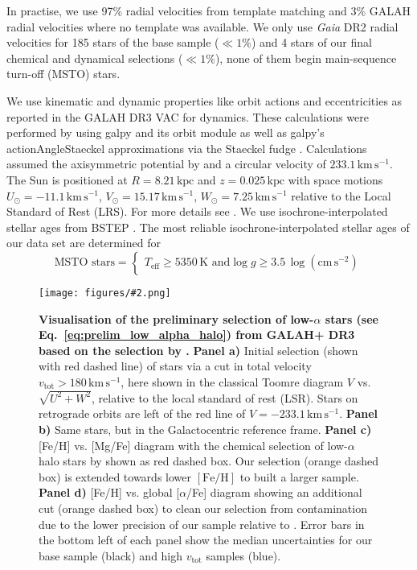 \documentclass[fleqn,usenatbib]{mnras}
\newcommand{\added}[1]{#1}
\newcommand{\kpc}{\,\mathrm{kpc}}	%
\newcommand{\kms}{\,\mathrm{km\,s^{-1}}}	%
\newcommand{\Gaia}{\textit{Gaia}\xspace} %
\newcommand{\codeicon}{{\faCloudDownload}}
\newcommand{\codelink}[1]{\href{https://github.com/svenbuder/Accreted-stars-in-GALAH-DR3/tree/main/figures/#1.ipynb}{\codeicon}\,\,}
\newcommand{\oscaption}[2]{\caption{#2 \codelink{#1}}}
\newcommand{\figuretextwidth}[4]{\begin{figure*} \centering \texttt{[image: figures/\#2.png]}\oscaption{#3}{#4}\label{fig:#2} \end{figure*}}
\begin{document}
\added{In practise, we use 97\% radial velocities from template matching and 3\% GALAH radial velocities where no template was available. We only use \Gaia DR2 radial velocities for 185 stars of the base sample ($\ll 1\%$) and 4 stars of our final chemical and dynamical selections ($\ll1\%$), none of them begin main-sequence turn-off (MSTO) stars.}

We use kinematic and dynamic properties like orbit actions and eccentricities as reported in the GALAH DR3 VAC for dynamics. These calculations were performed by using {\sc galpy} \citep{Bovy2015} and its {\sc orbit} module as well as {\sc galpy}'s {\sc actionAngleStaeckel} approximations via the Staeckel fudge  \citep{Binney2012, Mackereth2018}. Calculations assumed the axisymmetric potential by \citet{McMillan2017} and a circular velocity of $233.1\kms$. The Sun is positioned at $R = 8.21\kpc$ and $z=0.025\kpc$ \citep{Juric2008} with space motions $U_\odot = -11.1\kms$, $V_\odot = 15.17\kms$, $W_\odot = 7.25\kms$ \citep{Schoenrich2010,Reid2004} relative to the Local Standard of Rest (LRS).  For more details see \citet{Buder2021}. We use isochrone-interpolated stellar ages from BSTEP \citep{Sharma2018}. The most reliable isochrone-interpolated stellar ages of our data set are determined for
\begin{equation} \label{eq:msto}
\text{MSTO stars} = 
\begin{cases}
T_\text{eff} \geq 5350\,\mathrm{K} \text{ and} 
\log g \geq 3.5\,\mathrm{\log \left(cm\,s^{-2} \right)} 
\end{cases}
\end{equation}

\figuretextwidth{17cm}{nissen_selection_corner}{chemical_differences}{
\textbf{Visualisation of the preliminary selection of low-$\alpha$ stars (see Eq.~\ref{eq:prelim_low_alpha_halo}) from GALAH+ DR3 based on the selection by \citet{Nissen2010}.}
\textbf{Panel a)} Initial selection (shown with red dashed line) of stars via a cut in total velocity $v_\text{tot} > 180\,\mathrm{km\,s^{-1}}$, here shown in the classical Toomre diagram $V$ vs. $\sqrt{U^2 + W^2}$, relative to the local standard of rest (LSR). Stars on retrograde orbits are left of the red line of $V = -233.1\kms$.
\textbf{Panel b)} Same stars, but in the Galactocentric reference frame.
\textbf{Panel c)} [Fe/H] vs. [Mg/Fe] diagram with the chemical selection of low-$\alpha$ halo stars by \citet{Nissen2010} shown as red dashed box. Our selection (orange dashed box) is extended towards lower $\mathrm{[Fe/H]}$ to built a larger sample.
\textbf{Panel d)} [Fe/H] vs. global [$\alpha$/Fe] diagram showing an additional cut (orange dashed box) to clean our selection from contamination due to the lower precision of our sample relative to \citet{Nissen2010}.
Error bars in the bottom left of each panel show the median uncertainties for our base sample (black) and high $v_\text{tot}$ samples (blue).
}
\end{document}
